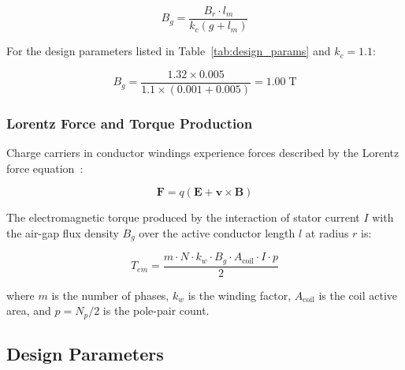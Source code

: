\documentclass[12pt,a4paper]{article}
\begin{document}
\begin{equation}
B_g = \frac{B_r \cdot l_m}{k_c \left( g + l_m \right)}
\label{eq:bgap}
\end{equation}

For the design parameters listed in Table~\ref{tab:design_params} and $k_c = 1.1$:

\begin{equation}
B_g = \frac{1.32 \times 0.005}{1.1 \times (0.001 + 0.005)} = 1.00 \; \text{T}
\end{equation}

\subsubsection{Lorentz Force and Torque Production}
Charge carriers in conductor windings experience forces described by the Lorentz force equation~\cite{ref17}:

\begin{equation}
\mathbf{F} = q(\mathbf{E} + \mathbf{v} \times \mathbf{B})
\end{equation}

The electromagnetic torque produced by the interaction of stator current $I$ with the air-gap flux density $B_g$ over the active conductor length $l$ at radius $r$ is:

\begin{equation}
T_{em} = \frac{m \cdot N \cdot k_w \cdot B_g \cdot A_{\text{coil}} \cdot I \cdot p}{2}
\end{equation}

where $m$ is the number of phases, $k_w$ is the winding factor, $A_{\text{coil}}$ is the coil active area, and $p = N_p/2$ is the pole-pair count.

\subsection{Design Parameters}
\end{document}
